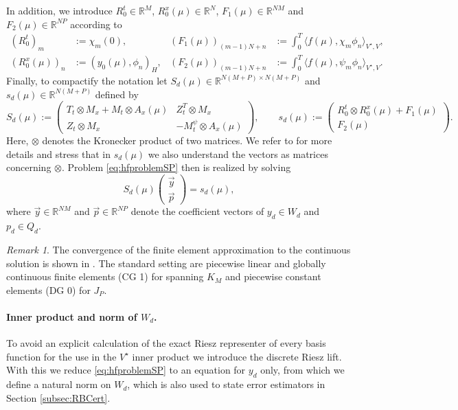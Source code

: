 \documentclass{article}
\theoremstyle{plain}
\theoremstyle{definition}
\theoremstyle{remark}
\newtheorem{remark}[theorem]{Remark}
\newcommand{\RR}{\mathbb{R}}
\begin{document}
In addition, we introduce $R_0^t \in \RR^{M}$, $R_0^x(\mu) \in \RR^{N}$, $F_1(\mu) \in \RR^{NM}$ and $F_2(\mu) \in \RR^{NP}$ according to
\begin{align}
    (R_0^t)_m &:= \chi_m(0),      
    &(F_1(\mu))_{(m-1)N+n} &:= \int_0^T \langle f(\mu),\chi_m\phi_n\rangle_{V^\star,V},\\
    (R_0^x(\mu))_n &:= (y_0(\mu),\phi_n)_H, 
    & (F_2(\mu))_{(m-1)N+n} &:= \int_0^T \langle f(\mu),\psi_m\phi_n\rangle_{V^\star,V}.
\end{align}
%
Finally, to compactify the notation let $S_d(\mu) \in \RR^{N(M + P) \times N(M + P)}$ and $s_d(\mu) \in \RR^{N(M + P)}$ defined by
\begin{equation}
    S_d(\mu) := \begin{pmatrix} T_t \otimes M_x + M_t \otimes A_x(\mu) & Z_t^T \otimes M_x \\
    Z_t \otimes M_x & -M_t^\psi \otimes A_x(\mu)
    \end{pmatrix},
    \qquad
    s_d(\mu) := \begin{pmatrix} R_0^t \otimes R_0^x(\mu) + F_1(\mu) \\ F_2(\mu)
    \end{pmatrix} .
\end{equation}
Here, $\otimes$ denotes the Kronecker product of two matrices. We refer to \cite[§~1.3.6]{Golub} for more details and stress that in $s_d(\mu)$ we also understand the vectors as matrices concerning $\otimes$. Problem \eqref{eq:hfproblemSP} then is realized by solving
\begin{equation}\label{eq:SP_RB_diskr}
    S_d(\mu) \begin{pmatrix} \Vec{y}\\ \Vec{p}\end{pmatrix} = s_d(\mu),
\end{equation}
where $\Vec{y} \in \RR^{NM}$ and $\Vec{p} \in \RR^{NP}$ denote the coefficient vectors of $y_d \in W_d$ and $p_d \in Q_d$. 
\begin{remark}\label{rem:stiffnessTime}
The convergence of the finite element approximation to the continuous solution is shown in \cite{preprint_SP}. The standard setting are piecewise linear and globally continuous finite elements (CG 1) for spanning $K_M$ and piecewise constant elements (DG 0) for $J_P$. 
\end{remark}

\paragraph*{Inner product and norm of $W_d$.} To avoid an explicit calculation of the exact Riesz representer of every basis function for the use in the $V^\star$ inner product we introduce the discrete Riesz lift. With this we reduce \eqref{eq:hfproblemSP} to an equation for $y_d$ only, from which we define a natural norm on $W_d$, which is also used to state error estimators in Section \ref{subsec:RBCert}.\\
\end{document}
